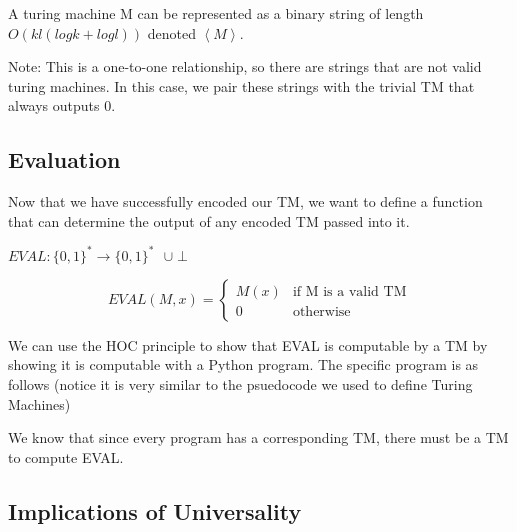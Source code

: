 \begin{theorem}

    A turing machine M can be represented as a binary string of length $O(kl(logk + logl))$ denoted $\left<M\right>$. 
\end{theorem}

Note: This is a one-to-one relationship, so there are strings that are not valid turing machines. In this case, we pair these strings with the trivial TM that always outputs 0. 

\pagebreak

\subsection*{Evaluation}
Now that we have successfully encoded our TM, we want to define a function that can determine the output of any encoded TM passed into it.

\begin{definition}
    $EVAL: \{0, 1\}^* \rightarrow \{0, 1\}^* \text{ }\cup \perp$

    \begin{equation*}
        EVAL(M, x) = \begin{cases}
            M(x) & \text{if M is a valid TM} \\
            0 & \text{otherwise}
        \end{cases}
    \end{equation*}
\end{definition}

{
    
    We can use the HOC principle to show that EVAL is computable by a TM by showing it is computable with a Python program. The specific program is as follows (notice it is very similar to the psuedocode we used to define Turing Machines)

    \begin{center}\end{center}

    We know that since every program has a corresponding TM, there must be a TM to compute EVAL.
}

\subsection*{Implications of Universality}

